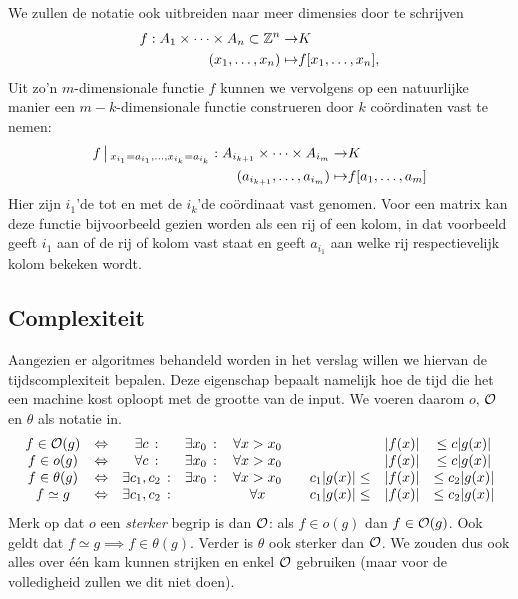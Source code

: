 We zullen de notatie ook uitbreiden naar meer dimensies door te schrijven
\begin{equation*}
\begin{split}
f: A_1\times \cdots \times A_n\subset \mathbb{Z}^n \to& K \\
       (x_1,\ldots,x_n) \mapsto& f[x_1,\ldots,x_n],
\end{split}
\end{equation*}
Uit zo'n $m$-dimensionale functie $f$ kunnen we vervolgens op een natuurlijke manier een $m-k$-dimensionale
functie construeren door $k$ co\"ordinaten vast te nemen:
\begin{equation*}
\begin{split}
f\,\big|\,_{x_{i_1}=a_{i_1},\ldots,x_{i_k}=a_{i_k}}: A_{i_{k+1}}\times\cdots\times A_{i_{m}} \to& K \\
(a_{i_{k+1}},\ldots,a_{i_{m}}) \mapsto& f[a_1,\ldots,a_m]
\end{split}
\end{equation*}
Hier zijn $i_1$'de tot en met de $i_k$'de co\"ordinaat vast genomen. Voor een matrix kan deze functie
bijvoorbeeld gezien worden als een rij of een kolom, in dat voorbeeld geeft $i_1$ aan of de rij of kolom
vast staat en geeft $a_{i_1}$ aan welke rij respectievelijk kolom bekeken wordt.

\subsection{Complexiteit}

Aangezien er algoritmes behandeld worden in het verslag willen we hiervan de tijdscomplexiteit bepalen.
Deze eigenschap bepaalt namelijk hoe de tijd die het een machine kost oploopt met de grootte van de input.
We voeren daarom $o$, $\mathcal{O}$ en $\theta$ als notatie in.
\begin{equation*}
\begin{array}{cccccccc}
  f \in \mathcal{O}(g)     &\Leftrightarrow& \exists c     \,:&\exists x_0  \,:&\, 
  \forall x>x_0 \quad&& |f(x)| &\leq c|g(x)|  \\
  f \in o(g)      &\Leftrightarrow& \forall c     \,:&\exists x_0  \,:&\, 
  \forall x>x_0 \quad&& |f(x)| &\leq c |g(x)| \\ 
  f \in \theta(g) &\Leftrightarrow& \exists c_1,c_2\,:&\exists x_0  \,:&\, 
  \forall x>x_0 \quad& c_1|g(x)| \leq & |f(x)| &\leq c_2|g(x)|  \\
  f \simeq g & \Leftrightarrow& \exists c_1,c_2\,:& \,&\, 
  \forall x \quad& c_1|g(x)| \leq & |f(x)| &\leq c_2|g(x)| 

\end{array}
\end{equation*}
Merk op dat $o$ een \emph{sterker} begrip is dan $\mathcal{O}$: als $f \in o(g)$ dan $f \in \mathcal{O}(g)$. Ook geldt dat $f\simeq g \implies f\in\theta(g)$. Verder is $\theta$ ook sterker dan $\mathcal{O}$. We zouden dus ook alles over \'e\'en kam kunnen strijken en enkel $\mathcal{O}$ gebruiken (maar voor de volledigheid zullen we dit niet doen).

